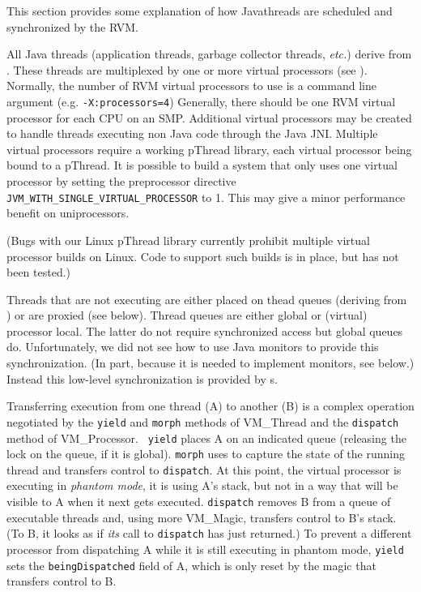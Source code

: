 This section provides some explanation of how Java\trademark threads are
scheduled and synchronized by the RVM.


All Java threads (application threads, garbage collector threads, {\em
etc.})  derive from 
.  
These threads are multiplexed by
one or more virtual processors (see 
).  Normally, the
number of RVM virtual processors to use is a command line argument
(e.g. {\tt -X:processors=4}) Generally, there should be one RVM
virtual processor for each CPU on an SMP.  Additional virtual
processors may be created to handle threads executing non Java code
through the Java JNI.  Multiple virtual processors require a working
pThread library, each virtual processor being bound to a pThread.  It
is possible to build a system that only uses one virtual processor by
setting the preprocessor directive {\tt
JVM\_WITH\_SINGLE\_VIRTUAL\_PROCESSOR} to 1.  This may give a minor
performance benefit on uniprocessors.

(Bugs with our Linux pThread library currently prohibit multiple
virtual processor builds on Linux.  Code to support such builds is in
place, but has not been tested.)

Threads that are not executing are either placed on thead queues
(deriving from 
) or are proxied (see below).
Thread queues are either global or (virtual) processor local.  The
latter do not require synchronized access but global queues do.
Unfortunately, we did not see how to use Java monitors to provide
this synchronization.  (In part, because it is needed to implement
monitors, see below.)  Instead this low-level synchronization is
provided by 
s.

Transferring execution from one thread (A) to another (B) is a complex
operation negotiated by the {\tt yield} and {\tt morph} methods of
VM\_Thread and the {\tt dispatch} method of VM\_Processor.  {\tt
yield} places A on an indicated queue (releasing the lock on the
queue, if it is global).  {\tt morph} uses 
to capture the
state of the running thread and transfers control to {\tt dispatch}.
At this point, the virtual processor is executing in {\em phantom
mode}, it is using A's stack, but not in a way that will be visible to
A when it next gets executed.  {\tt dispatch} removes B from a queue
of executable threads and, using more VM\_Magic, transfers control
to B's stack.  (To B, it looks as if {\em its} call to {\tt dispatch}
has just returned.)  To prevent a different processor from dispatching
A while it is still executing in phantom mode, {\tt yield} sets the
{\tt beingDispatched} field of A, which is only reset by the magic
that transfers control to B.

